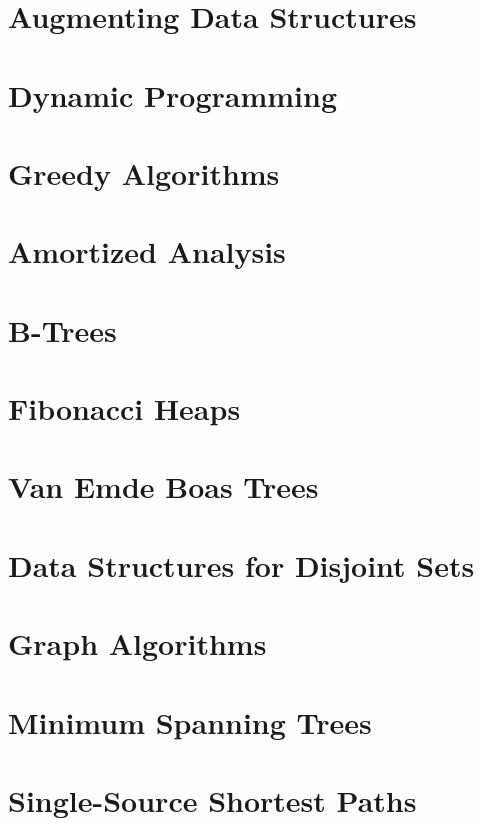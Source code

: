 \documentclass{book}
\begin{document}
\chapter{Augmenting Data Structures}

\chapter{Dynamic Programming}

\chapter{Greedy Algorithms}

\chapter{Amortized Analysis}

\chapter{B-Trees}

\chapter{Fibonacci Heaps}

\chapter{Van Emde Boas Trees}

\chapter{Data Structures for Disjoint Sets}

\chapter{Graph Algorithms}

\chapter{Minimum Spanning Trees}

\chapter{Single-Source Shortest Paths}
\end{document}
